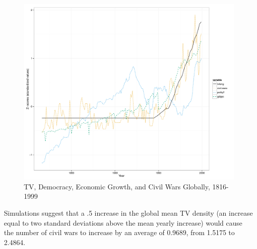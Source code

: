 \documentclass[11pt,article,oneside]{memoir}
\makeatletter
\def\maxwidth{\ifdim\Gin@nat@width>\linewidth\linewidth
\else\Gin@nat@width\fi}
\let\Oldincludegraphics\includegraphics
\renewcommand{\includegraphics}[1]{\Oldincludegraphics[width=\maxwidth]{#1}}
\makeatother
\begin{document}
\begin{figure}[htbp]
\centering
\includegraphics{media_civil_war_files/figure-markdown/longrunplot.pdf}
\caption{TV, Democracy, Economic Growth, and Civil Wars Globally,
1816-1999}
\end{figure}

Simulations suggest that a .5 increase in the global mean TV density (an
increase equal to two standard deviations above the mean yearly
increase) would cause the number of civil wars to increase by an average
of 0.9689, from 1.5175 to 2.4864.
\end{document}
